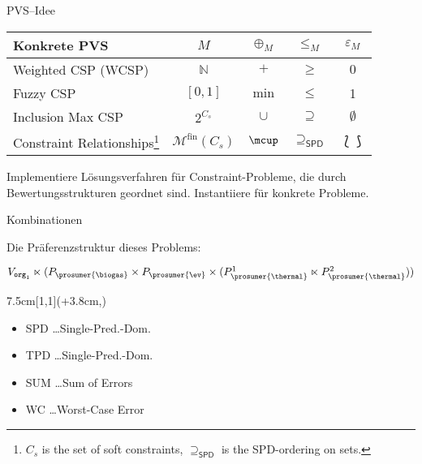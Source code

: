 \begin{frame}[fragile]{PVS--Idee}
\begin{center}
\begin{tabular}{l|c|c|c|c}
\textbf{Konkrete PVS} & $M$ & $\oplus_M$ & $\leq_M$ & $\varepsilon_M$ \\ 
\hline 
Weighted CSP (WCSP)& $\mathbb{N}$ & $+$ & $\geq$ & $0$ \\ 
Fuzzy CSP & $[0,1]$ & $\min$ & $\leq$  & 1 \\ 
Inclusion Max CSP & $2^{C_s}$ & $\cup$ & $\supseteq$  & $\emptyset$ \\ 
Constraint Relationships\footnote{$C_s$ is the set of soft constraints, $\supseteq_{\mathsf{SPD}}$ is the SPD-ordering on sets.} &$\mathcal{M}^{\mathrm{fin}} (C_s)$ & $\mcup$ & $\supseteq_{\mathsf{SPD}}$ & $\lbag \rbag$ \\ 
\end{tabular} 
\end{center}

\begin{parchment}[Hauptidee]
Implementiere Lösungsverfahren für Constraint-Probleme, die durch Bewertungsstrukturen geordnet sind. Instantiiere für konkrete Probleme.
\end{parchment}
\end{frame}


\begin{frame}{Kombinationen~\cite{SchiendorferPvs2015}}
\fontsize{8pt}{7.2}\selectfont

Die Präferenzstruktur dieses Problems:
\vspace*{2ex}

\qquad $
  V_{\mathtt{org}_1} \ltimes (P_{\prosumer{\biogas}} \times P_{\prosumer{\ev}} \times (P_{\prosumer{\thermal}}^1 \ltimes P_{\prosumer{\thermal}}^2))
$
%
\begin{textblock*}{7.5cm}[1,1](\textwidth+3.8cm,\textheight-0.13cm)
\begin{itemize}
\item[] \textsc{SPD} \ldots Single-Pred.-Dom.
\item[] \textsc{TPD} \ldots Single-Pred.-Dom.
\item[] \textsc{SUM} \ldots Sum of Errors
\item[] \textsc{WC} \ldots Worst-Case Error


\end{itemize}
 \end{textblock*}
\end{frame}
